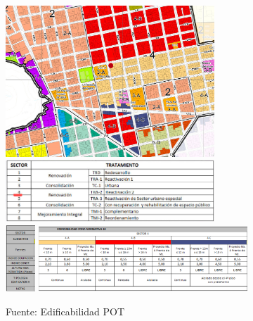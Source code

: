 \documentclass[12pt,a4paper,twoside]{article}
\begin{document}
{\begin{figure}[!h]
	\centering
	\includegraphics[width=0.7\textwidth]{Norma/Edificabilidad}
	\includegraphics[width=0.7\textwidth]{Norma/Edificabilidad1}\\	\includegraphics[width=0.1\textwidth]{Norma/Edificabilidad3}
	\includegraphics[width=0.7\textwidth]{Norma/Edificabilidad2}\\
	\caption{Fuente: Edificabilidad POT}
	\label{fig:tratamiento}
\end{figure}




}
\end{document}

